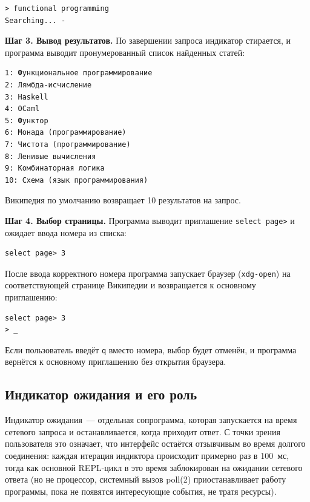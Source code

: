 \documentclass[12pt]{extarticle}
\renewcommand{\baselinestretch}{1.5}
\begin{document}
\renewcommand{\baselinestretch}{1}
\begin{lstlisting}
> functional programming
Searching... -
\end{lstlisting}
\renewcommand{\baselinestretch}{1.5}

\textbf{Шаг 3. Вывод результатов.} По завершении запроса
индикатор стирается, и программа выводит пронумерованный список
найденных статей:

\renewcommand{\baselinestretch}{1}
\begin{lstlisting}
1: Функциональное программирование
2: Лямбда-исчисление
3: Haskell
4: OCaml
5: Функтор
6: Монада (программирование)
7: Чистота (программирование)
8: Ленивые вычисления
9: Комбинаторная логика
10: Схема (язык программирования)
\end{lstlisting}
\renewcommand{\baselinestretch}{1.5}

Википедия по умолчанию возвращает 10 результатов на запрос.

\textbf{Шаг 4. Выбор страницы.} Программа выводит приглашение
\texttt{select page>} и ожидает ввода номера из списка:

\renewcommand{\baselinestretch}{1}
\begin{lstlisting}
select page> 3
\end{lstlisting}
\renewcommand{\baselinestretch}{1.5}

После ввода корректного номера программа запускает браузер
(\texttt{xdg-open}) на соответствующей странице Википедии и
возвращается к основному приглашению:

\renewcommand{\baselinestretch}{1}
\begin{lstlisting}
select page> 3
> _
\end{lstlisting}
\renewcommand{\baselinestretch}{1.5}

Если пользователь введёт \texttt{q} вместо номера, выбор будет
отменён, и программа вернётся к основному приглашению без
открытия браузера.

\subsection{Индикатор ожидания и его роль}

Индикатор ожидания~--- отдельная сопрограмма, которая запускается на время
сетевого запроса и останавливается, когда приходит ответ. С точки
зрения пользователя это означает, что интерфейс остаётся
отзывчивым во время долгого соединения: каждая итерация индиктора
происходит примерно раз в 100~мс, тогда как основной REPL-цикл в
это время заблокирован на ожидании сетевого ответа (но не
процессор, системный вызов poll(2) приостанавливает работу программы, пока не появятся интересующие события, не тратя ресурсы).
\end{document}
